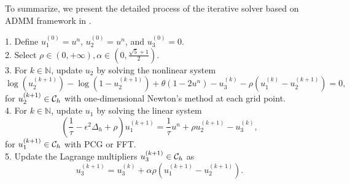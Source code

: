 \par To summarize, we present the detailed process of the iterative solver based on ADMM framework in .
\begin{algorithm}[!t]
    \caption{Iterative solver based on ADMM framework}
\label{alg:ADMM}
    \raggedright
    1. Define $u_1^{(0)}=u^n$, $u_2^{(0)}=u^n$, and
    $u_3^{(0)}=0$.\\
    2. Select $\rho\in(0,+\infty), \alpha \in (0,\frac{\sqrt{5}+1}{2})$.\\
    3. For $k\in\mathbb{N}$, update $u_2$ by solving the nonlinear system
    \begin{equation}
    \log(u_2^{(k+1)})-\log(1-u_2^{(k+1)})+
    \theta(1-2u^n)-u_3^{(k)}-\rho(u_1^{(k)}-u_2^{(k+1)})=0,
    \end{equation}
    \hspace{10pt} for $u_2^{(k+1)}\in{\mathcal{C}_h}$ with one-dimensional Newton's method at each grid point.\\
    4. For $k\in\mathbb{N}$, update $u_1$ by solving the linear system
    \begin{equation}
    \label{u1}
        (\frac{1}{\tau}-\epsilon^2\Delta_h+\rho)u_1^{(k+1)}=\frac{1}{\tau}u^n+\rho u_2^{(k+1)}-u_3^{(k)},
    \end{equation}
    \hspace{10pt} for $u_1^{(k+1)}\in{\mathcal{C}_h}$ with PCG or FFT.\\ 
    5. Update the Lagrange multipliers $u_3^{(k+1)}\in{\mathcal{C}_h}$ as
    \begin{equation}\label{eq:u3}
    u_3^{(k+1)}=u_3^{(k)}+\alpha \rho(u_1^{(k+1)}-u_2^{(k+1)}).
    \end{equation}
\end{algorithm}
